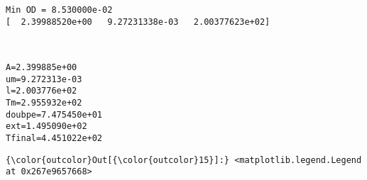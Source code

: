 \documentclass[11pt]{article}
\begin{document}
    \begin{Verbatim}[commandchars=\\\{\}]
Min OD = 8.530000e-02
[  2.39988520e+00   9.27231338e-03   2.00377623e+02]

    \end{Verbatim}

    \begin{center}
    \end{center}
    { \hspace*{\fill} \\}
    
    \begin{Verbatim}[commandchars=\\\{\}]
A=2.399885e+00
um=9.272313e-03
l=2.003776e+02
Tm=2.955932e+02
doubpe=7.475450e+01
ext=1.495090e+02
Tfinal=4.451022e+02

    \end{Verbatim}

            \begin{Verbatim}[commandchars=\\\{\}]
{\color{outcolor}Out[{\color{outcolor}15}]:} <matplotlib.legend.Legend at 0x267e9657668>
\end{Verbatim}
        
    \begin{center}
    \end{center}
    { \hspace*{\fill} \\}
    
    \begin{center}
    \end{center}
    { \hspace*{\fill} \\}
    
\end{document}
